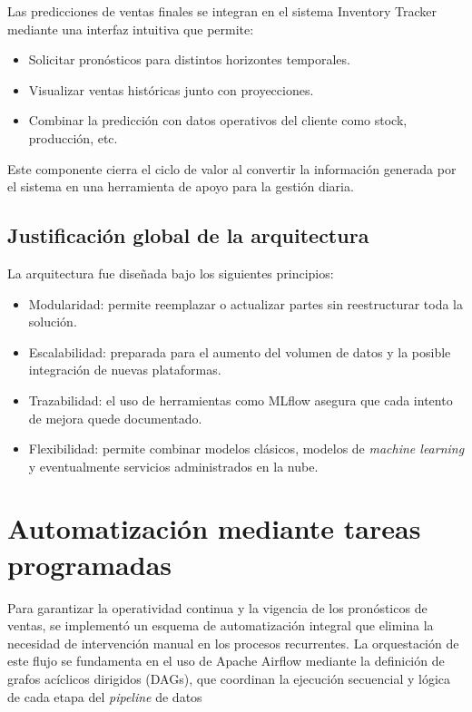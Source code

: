 Las predicciones de ventas finales se integran en el sistema Inventory Tracker mediante una interfaz intuitiva que permite:

\begin{itemize}
	\item Solicitar pronósticos para distintos horizontes temporales.
	\item Visualizar ventas históricas junto con proyecciones.
	\item Combinar la predicción con datos operativos del cliente como stock, producción, etc.
\end{itemize}

Este componente cierra el ciclo de valor al convertir la información generada por el sistema en una herramienta de apoyo para la gestión diaria.


\subsection{Justificación global de la arquitectura}

La arquitectura fue diseñada bajo los siguientes principios:

\begin{itemize}
	\item Modularidad: permite reemplazar o actualizar partes sin reestructurar toda la solución.

	\item Escalabilidad: preparada para el aumento del volumen de datos y la posible integración de nuevas plataformas.

	\item Trazabilidad: el uso de herramientas como MLflow asegura que cada intento de mejora quede documentado.

	\item Flexibilidad: permite combinar modelos clásicos, modelos de \textit{machine learning} y eventualmente servicios administrados en la nube.
\end{itemize}


\section{Automatización mediante tareas programadas}

Para garantizar la operatividad continua y la vigencia de los pronósticos de ventas, se implementó un esquema de automatización integral que elimina la necesidad de intervención manual en los procesos recurrentes. La orquestación de este flujo se fundamenta en el uso de Apache Airflow mediante la definición de grafos acíclicos dirigidos (DAGs), que coordinan la ejecución secuencial y lógica de cada etapa del \textit{pipeline} de datos

